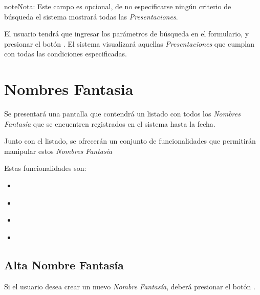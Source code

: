 \documentclass[a4paper,10pt,spanish]{sphinxmanual}
\begin{document}
\begin{notice}{note}{Nota:}
Este campo es opcional, de no especificarse ningún criterio de búsqueda el sistema mostrará todas las \emph{Presentaciones}.
\end{notice}

El usuario tendrá que ingresar los parámetros de búsqueda en el formulario, y presionar el botón . El sistema visualizará aquellas \emph{Presentaciones} que cumplan con todas las condiciones especificadas.


\section{Nombres Fantasia}
\label{nombresfantasia:nombres-fantasia}\label{nombresfantasia::doc}
Se presentará una pantalla que contendrá un listado con todos los \emph{Nombres Fantasía} que se encuentren registrados en el sistema hasta la fecha.


Junto con el listado, se ofrecerán un conjunto de funcionalidades que permitirán manipular estos \emph{Nombres Fantasía}

Estas funcionalidades son:
\begin{itemize}
\item {} 
{\hyperref[nombresfantasia:alta\string-nombre\string-fantasia]{}}

\item {} 
{\hyperref[nombresfantasia:modificar\string-nombre\string-fantasia]{}}

\item {} 
{\hyperref[nombresfantasia:eliminar\string-nombre\string-fantasia]{}}

\item {} 
{\hyperref[nombresfantasia:formulario\string-busqueda\string-nombre\string-fantasia]{}}

\end{itemize}


\subsection{Alta Nombre Fantasía}
\label{nombresfantasia:alta-nombre-fantasia}\label{nombresfantasia:id1}
Si el usuario desea crear un nuevo \emph{Nombre Fantasía}, deberá presionar el botón .
\end{document}
